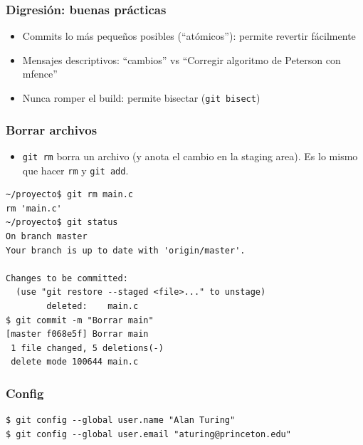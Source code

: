 \documentclass[a4paper, 12pt, aspectratio=169,
\ifhandout handout \else \fi
]{beamer}
\begin{document}
\begin{frame}
    \frametitle{Digresión: buenas prácticas}
    \begin{itemize}
        \item Commits lo más pequeños posibles (``atómicos''): permite revertir fácilmente
        \item Mensajes descriptivos: ``cambios'' vs ``Corregir algoritmo de Peterson con mfence''
        \item Nunca romper el build: permite bisectar (\texttt{git bisect})
    \end{itemize}
\end{frame}

\begin{frame}[fragile]
    \frametitle{Borrar archivos}
    \begin{itemize}
        \item \lstinline`git rm` borra un archivo (y anota el cambio
            en la staging area). Es lo mismo que hacer \lstinline`rm` y
            \lstinline`git add`.
    \end{itemize}
\begin{lstlisting}[basicstyle=\ttfamily\footnotesize]
~/proyecto$ git rm main.c
rm 'main.c'
~/proyecto$ git status
On branch master
Your branch is up to date with 'origin/master'.

Changes to be committed:
  (use "git restore --staged <file>..." to unstage)
        deleted:    main.c
$ git commit -m "Borrar main"
[master f068e5f] Borrar main
 1 file changed, 5 deletions(-)
 delete mode 100644 main.c
\end{lstlisting}
\end{frame}

\begin{frame}[fragile]
    \frametitle{Config}
    \begin{lstlisting}
$ git config --global user.name "Alan Turing"
$ git config --global user.email "aturing@princeton.edu"
    \end{lstlisting}
\end{frame}
\end{document}
